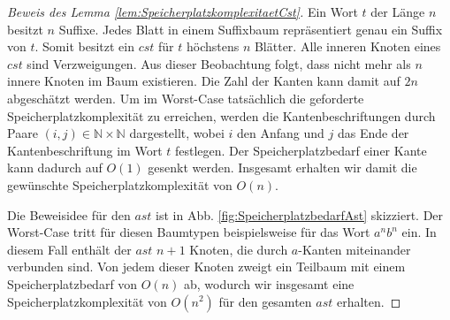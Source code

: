 \documentclass[12pt]{report}
\begin{document}
\begin{proof}[Beweis des Lemma \ref{lem:SpeicherplatzkomplexitaetCst}]
Ein Wort $t$ der Länge $n$ besitzt $n$ Suffixe. Jedes Blatt in einem Suffixbaum repräsentiert genau ein Suffix von $t$. Somit besitzt ein $cst$ für $t$ höchstens $n$ Blätter. Alle inneren Knoten eines $cst$ sind Verzweigungen. Aus dieser Beobachtung folgt, dass nicht mehr als $n$ innere Knoten im Baum existieren. Die Zahl der Kanten kann damit auf $2n$ abgeschätzt werden. Um im Worst-Case tatsächlich die geforderte Speicherplatzkomplexität zu erreichen, werden die Kantenbeschriftungen durch Paare $(i, j) \in \mathbb{N} \times \mathbb{N}$ dargestellt, wobei $i$ den Anfang und $j$ das Ende der Kantenbeschriftung im Wort $t$ festlegen. Der Speicherplatzbedarf einer Kante kann dadurch auf $O(1)$ gesenkt werden. Insgesamt erhalten wir damit die gewünschte Speicherplatzkomplexität von $O(n)$.

Die Beweisidee für den $ast$ ist in Abb. \ref{fig:SpeicherplatzbedarfAst} skizziert. Der Worst-Case tritt für diesen Baumtypen beispielsweise für das Wort $a^nb^n$ ein. In diesem Fall enthält der $ast$ $n + 1$ Knoten, die durch $a$-Kanten miteinander verbunden sind. Von jedem dieser Knoten zweigt ein Teilbaum mit einem Speicherplatzbedarf von $O(n)$ ab, wodurch wir insgesamt eine Speicherplatzkomplexität von $O(n^2)$ für den gesamten $ast$ erhalten.


\end{proof}
\end{document}
